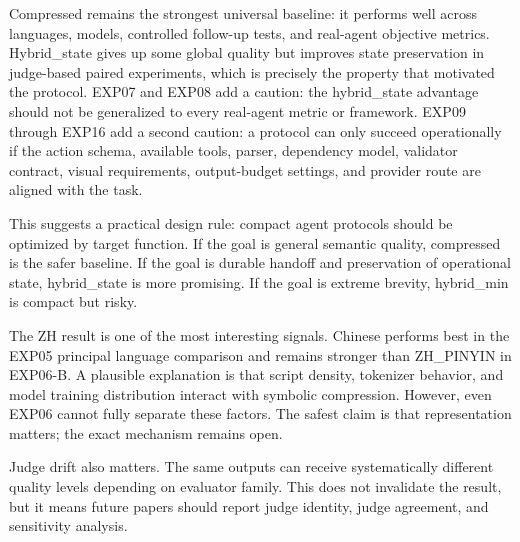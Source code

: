 \documentclass[11pt]{article}
\begin{document}
Compressed remains the strongest universal baseline: it performs well across languages, models, controlled follow-up tests, and real-agent objective metrics. Hybrid\_state gives up some global quality but improves state preservation in judge-based paired experiments, which is precisely the property that motivated the protocol. EXP07 and EXP08 add a caution: the hybrid\_state advantage should not be generalized to every real-agent metric or framework. EXP09 through EXP16 add a second caution: a protocol can only succeed operationally if the action schema, available tools, parser, dependency model, validator contract, visual requirements, output-budget settings, and provider route are aligned with the task.

This suggests a practical design rule: compact agent protocols should be optimized by target function. If the goal is general semantic quality, compressed is the safer baseline. If the goal is durable handoff and preservation of operational state, hybrid\_state is more promising. If the goal is extreme brevity, hybrid\_min is compact but risky.

The ZH result is one of the most interesting signals. Chinese performs best in the EXP05 principal language comparison and remains stronger than ZH\_PINYIN in EXP06-B. A plausible explanation is that script density, tokenizer behavior, and model training distribution interact with symbolic compression. However, even EXP06 cannot fully separate these factors. The safest claim is that representation matters; the exact mechanism remains open.

Judge drift also matters. The same outputs can receive systematically different quality levels depending on evaluator family. This does not invalidate the result, but it means future papers should report judge identity, judge agreement, and sensitivity analysis.
\end{document}
